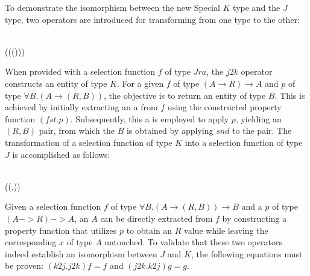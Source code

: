 To demonstrate the isomorphism between the new Special $K$ type and the $J$ type, two 
operators are introduced for transforming from one type to the other:
\begin{hscode}\SaveRestoreHook
{}%
%
%
\>[3]{}\mathbin{::}\;\;\to {}\;\;\<[E]%
\\
\>[3]{}\;\;\mathrel{=}\;(\;(\;(\mathbin{\circ}))){}\<[E]%
\ColumnHook
\end{hscode}\resethooks
When provided with a selection function $f$ of type $J r a$, the $j2k$ operator constructs 
an entity of type $K$. For a given $f$ of type $(A \rightarrow R) \rightarrow A$ and 
$p$ of type $\forall B. (A \rightarrow (R,B))$, the objective is to return an entity of 
type $B$. This is achieved by initially extracting an a from $f$ using the constructed 
property function $(fst . p)$. Subsequently, this a is employed to apply $p$, yielding an 
$(R,B)$ pair, from which the $B$ is obtained by applying $snd$ to the pair.
The transformation of a selection function of type $K$ into a selection function of type 
$J$ is accomplished as follows:
\begin{hscode}\SaveRestoreHook
{}%
%
%
\>[3]{}\mathbin{::}\;\;\to {}\;\;\<[E]%
\\
\>[3]{}\;\;\mathrel{=}\;(\lambda {}\to (\;,)){}\<[E]%
\ColumnHook
\end{hscode}\resethooks
Given a selection function $f$ of type $\forall B. (A \rightarrow (R,B)) \rightarrow B$ 
and a $p$ of type $(A -> R) -> A$, an $A$ can be directly extracted from $f$ by 
constructing a property function that utilizes $p$ to obtain an $R$ value while leaving 
the corresponding $x$ of type $A$ untouched.
To validate that these two operators indeed establish an isomorphism between $J$ and $K$, 
the following equations must be proven: $(k2j . j2k) f = f$ and $(j2k . k2j) g = g$.

